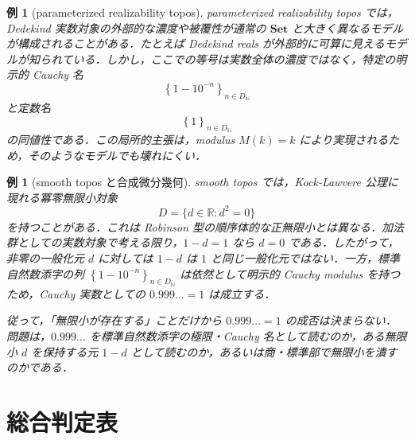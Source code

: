 \documentclass[a4paper,11pt]{ltjsarticle}
\theoremstyle{jpdef}
\newtheorem{example}[definition]{例}
\theoremstyle{jpthm}
\newcommand{\N}{\mathbb{N}}
\newcommand{\DN}{D_{\N}}
\newcommand{\seq}[2]{\left\{#1\right\}_{#2}}
\begin{document}
\begin{example}[parameterized realizability topos]
parameterized realizability topos では，Dedekind 実数対象の外部的な濃度や被覆性が通常の \(\mathbf{Set}\) と大きく異なるモデルが構成されることがある．たとえば Dedekind reals が外部的に可算に見えるモデルが知られている．しかし，ここでの等号は実数全体の濃度ではなく，特定の明示的 Cauchy 名
\[
  \seq{1-10^{-n}}{n\in\DN}
\]
と定数名
\[
  \seq{1}{n\in\DN}
\]
の同値性である．この局所的主張は，modulus \(M(k)=k\) により実現されるため，そのようなモデルでも壊れにくい．
\end{example}

\begin{example}[smooth topos と合成微分幾何]
smooth topos では，Kock-Lawvere 公理に現れる冪零無限小対象
\[
  D=\{d\in\mathbb R:d^2=0\}
\]
を持つことがある．これは Robinson 型の順序体的な正無限小とは異なる．加法群としての実数対象で考える限り，\(1-d=1\) なら \(d=0\) である．したがって，非零の一般化元 \(d\) に対しては \(1-d\) は \(1\) と同じ一般化元ではない．一方，標準自然数添字の列 \(\seq{1-10^{-n}}{n\in\DN}\) は依然として明示的 Cauchy modulus を持つため，Cauchy 実数としての \(0.999\ldots=1\) は成立する．

従って，「無限小が存在する」ことだけから \(0.999\ldots=1\) の成否は決まらない．問題は，\(0.999\ldots\) を標準自然数添字の極限・Cauchy 名として読むのか，ある無限小 \(d\) を保持する元 \(1-d\) として読むのか，あるいは商・標準部で無限小を潰すのかである．
\end{example}


\section{総合判定表}
\end{document}
